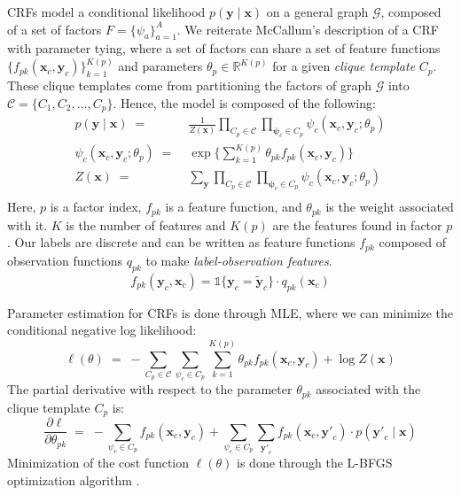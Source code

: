 \documentclass{article}
\begin{document}
CRFs model a conditional likelihood $p(\mathbf{y} \mid \mathbf{x})$ on a general
graph $\mathcal{G}$, composed of a set of factors
$F = \{ \psi_a \} _{a=1}^{A}$. We reiterate McCallum's description
of a CRF with parameter tying, where a set of factors can share a set of feature
functions $\{f_{pk}\left(\mathbf{x}_c, \mathbf{y}_c \right)\}_{k=1}^{K(p)}$ and
parameters $\theta_p \in \mathbb{R}^{K(p)}$ for a given \textit{clique template}
$C_p$. These clique templates come from partitioning the factors of graph
$\mathcal{G}$ into $\mathcal{C} = \{C_1, C_2, \hdots, C_p \}$. Hence, the model
is composed of the following:
\begin{equation}
  \begin{aligned}
    p(\mathbf{y} \mid \mathbf{x}) \; = \; & \frac{1}{Z(\mathbf{x})} \prod_{C_p \in \mathcal{C}} \prod_{\mathbf{\psi}_c \in C_p} \psi_c (\mathbf{x}_c, \mathbf{y}_c ; \theta_p) \\
    \psi_c (\mathbf{x}_c, \mathbf{y}_c ; \theta_p ) \; = \; & \exp \Bigg\{ \sum_{k=1}^{K(p)} \theta_{pk} f_{pk} (\mathbf{x}_c, \mathbf{y}_c) \Bigg\} \\
    Z(\mathbf{x}) \; = \; & \sum_{\mathbf{y}} \prod_{C_p \in \mathcal{C}} \prod_{\mathbf{\psi}_c \in C_p} \psi_c (\mathbf{x}_c, \mathbf{y}_c ; \theta_p) \\
  \end{aligned}
\end{equation}
Here, $p$ is a factor index, $f_{pk}$ is a feature function, and $\theta_{pk}$ is the
weight associated with it. $K$ is the number of features and $K(p)$ are the
features found in factor $p$.
Our labels are discrete and can be written as
feature functions $f_{pk}$ composed  of observation functions $q_{pk}$ to make
\textit{label-observation features}.
\begin{equation}
  f_{pk} (\mathbf{y}_c, \mathbf{x}_c) = \mathds{1} \{\mathbf{y}_c = \mathbf{\widetilde{y}}_c\} \cdot q_{pk}(\mathbf{x}_c)
\end{equation}

Parameter estimation for CRFs is done through MLE,
where we can minimize the conditional negative log likelihood:
\begin{equation}
  \ell (\theta) \; = \; - \sum_{C_p \in \mathcal{C}} \sum_{\psi_c \in C_p} \sum_{k=1}^{K(p)} \theta_{pk} f_{pk} (\mathbf{x}_c, \mathbf{y}_c) + \log Z(\mathbf{x})
\end{equation}
The partial derivative with respect to the parameter $\theta_{pk}$ associated
with the clique template $C_p$ is:
\begin{equation}
  \frac{\partial \ell}{\partial \theta_{pk}} \; = \; - \sum_{\psi_c \in C_p} f_{pk} (\mathbf{x}_c, \mathbf{y}_c) + \sum_{\psi_c \in C_p} \sum_{\mathbf{y'}_c} f_{pk} (\mathbf{x}_c, \mathbf{y'}_c) \cdot p(\mathbf{y'}_c \mid \mathbf{x})
\end{equation}
Minimization of the cost function $\ell(\theta)$ is done through the L-BFGS
optimization algorithm \cite{Nowozin}.
\end{document}
